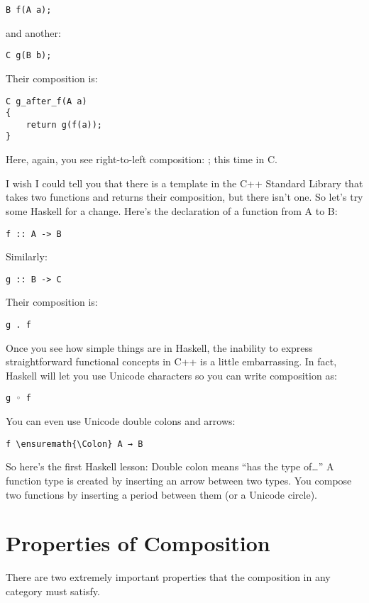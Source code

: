 \begin{Verbatim}
B f(A a);
\end{Verbatim}
and another:

\begin{Verbatim}
C g(B b);
\end{Verbatim}
Their composition is:

\begin{Verbatim}
C g_after_f(A a)
{
    return g(f(a));
}
\end{Verbatim}
Here, again, you see right-to-left composition: ; this
time in C.

I wish I could tell you that there is a template in the C++ Standard
Library that takes two functions and returns their composition, but
there isn't one. So let's try some Haskell for a change. Here's the
declaration of a function from A to B:

\begin{Verbatim}
f :: A -> B
\end{Verbatim}
Similarly:

\begin{Verbatim}
g :: B -> C
\end{Verbatim}
Their composition is:

\begin{Verbatim}
g . f
\end{Verbatim}
Once you see how simple things are in Haskell, the inability to express
straightforward functional concepts in C++ is a little embarrassing. In
fact, Haskell will let you use Unicode characters so you can write
composition as:
\begin{Verbatim}
g ◦ f
\end{Verbatim}
You can even use Unicode double colons and arrows:
\begin{Verbatim}[commandchars=\\\{\}]
f \ensuremath{\Colon} A → B
\end{Verbatim}
So here's the first Haskell lesson: Double colon means ``has the type
of\ldots{}'' A function type is created by inserting an arrow between
two types. You compose two functions by inserting a period between them
(or a Unicode circle).

\section{Properties of Composition}

There are two extremely important properties that the composition in any
category must satisfy.

